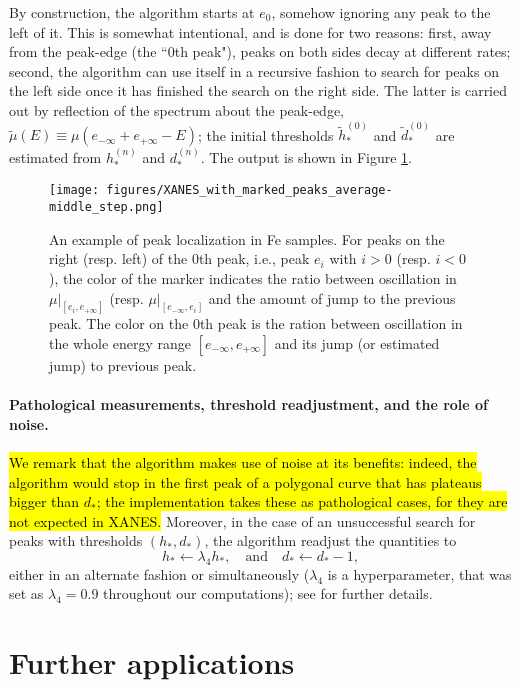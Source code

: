 \documentclass[%
 reprint,
 amsmath,amssymb,
 aps,
]{revtex4-1}
\begin{document}
By construction,  the algorithm starts at  $e_0$,  somehow ignoring any peak to the left of it. This is somewhat intentional, and is done for two reasons: first, away from the peak-edge (the ``0th peak"), peaks on both sides decay at different rates; second, the algorithm can use itself in a recursive fashion to search for peaks on the left side once it has finished the search on the right side. The latter is carried out by reflection of the spectrum  about the peak-edge,   $\widetilde{\mu}(E) \equiv \mu( e_{-\infty}+e_{+\infty} -E)$; the initial thresholds $\widetilde{h}_*^{(0)}$ and  $\widetilde{d}_*^{(0)}$ are estimated from $h_*^{(n)}$ and  $d_*^{(n)}$. 
%
The output is shown in Figure \ref{fig:other_side_with_marked_peaks}.
\begin{figure}[htb]
 \texttt{[image: figures/XANES\_with\_marked\_peaks\_average-middle\_step.png]}
 \caption{An example of peak localization in Fe samples. For peaks on the right (resp. left) of the 0th peak, i.e., peak $e_i$ with  $i>0$ (resp. $i<0$), the  color of the marker indicates the ratio between oscillation in $\mu\Big|_{[e_{i},e_{+\infty}]}$ (resp. $\mu\Big|_{[e_{-\infty}, e_{i}]}$ and the amount of jump to the previous peak. The color on the 0th peak is the ration between oscillation in the whole energy range $[e_{-\infty}, e_{+\infty}]$ and its jump (or estimated jump) to previous peak. \label{fig:other_side_with_marked_peaks}}
\end{figure}

\paragraph*{Pathological measurements, threshold readjustment,  and the role of noise.}\label{subsec:pathological}

\hl{We remark that the algorithm makes use of noise at its benefits: indeed, the algorithm would stop in the first peak of a polygonal curve that has plateaus bigger than $d_*$; the implementation takes these as pathological cases, for they are not expected in XANES.} Moreover, in the case of an unsuccessful search for peaks with thresholds $(h_*,d_*)$, the algorithm readjust the quantities to 
%
$$ h_*\leftarrow  \lambda_4 h_*, \quad \text{and} \quad d_* \leftarrow d_* -1,$$
%
either in an alternate fashion or simultaneously ($\lambda_4$ is a hyperparameter, that was set as $\lambda_4 = 0.9$ throughout our computations); see \cite{github} for further details.


\section*{Further applications}
\end{document}
